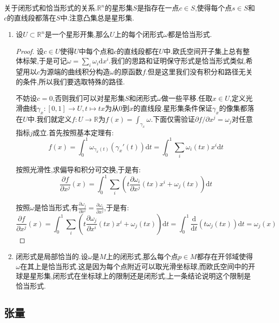 关于闭形式和恰当形式的关系.$\mathbb{R}^n$的星形集$S$是指存在一点$c\in S$,使得每个点$s\in S$和$c$的直线段都落在$S$中.注意凸集总是星形集.
\begin{enumerate}
	\item 设$U\subset\mathbb{R}^n$是一个星形开集,那么$U$上的每个闭形式$\omega$都是恰当形式.
	\begin{proof}
		
		设$c\in U$使得$U$中每个点和$c$的直线段都在$U$中.欧氏空间开子集上总有整体标架,于是可记$\omega=\sum_i\omega_i\mathrm{d}x^i$.我们的思路和证明保守形式是恰当形式类似,希望用以$c$为源端的曲线积分构造$\omega$的原函数$f$.但是这里我们没有积分和路径无关的条件,所以我们要选取特殊的路径.
		
		不妨设$c=0$,否则我们可以对星形集$S$和闭形式$\omega$做一些平移.任取$x\in U$,定义光滑曲线$\gamma_x:[0,1]\to U,t\mapsto tx$为从$0$到$x$的直线段.星形集条件保证$\gamma_x$的像集都落在$U$中.我们就定义$f:U\to\mathbb{R}$为$f(x)=\int_{\gamma_x}\omega$.下面仅需验证$\partial f/\partial x^j=\omega_j$对任意指标$j$成立.首先按照基本定理有:
		$$f(x)=\int_0^1\omega_{\gamma_x(t)}(\gamma_x'(t))\mathrm{d}t=\int_0^1\sum_i\omega_i(tx)x^i\mathrm{d}t$$
		
		按照光滑性,求偏导和积分可交换,于是有:
		$$\frac{\partial f}{\partial x^j}(x)=\int_0^1\sum_i\left(t\frac{\partial\omega_i}{\partial x^j}(tx)x^i+\omega_j(tx)\right)\mathrm{d}t$$
		
		按照$\omega$是恰当形式,有$\frac{\partial\omega_j}{\partial x^i}=\frac{\partial\omega_i}{\partial x^j}$,于是有:
		$$\frac{\partial f}{\partial x^j}(x)=\int_0^1\sum_i\left(t\frac{\partial\omega_j}{\partial x^i}(tx)x^i+\omega_j(tx)\right)\mathrm{d}t=\int_0^1\frac{\mathrm{d}}{\mathrm{d}t}(t\omega_j(tx))\mathrm{d}t=\omega_j(x)$$
	\end{proof}
    \item 闭形式是局部恰当的.设$\omega$是$M$上的闭形式,那么每个点$p\in M$都存在开邻域使得$\omega$在其上是恰当形式.这是因为每个点附近可以取光滑坐标球,而欧氏空间中的开球是星形集,闭形式在坐标球上的限制还是闭形式,上一条结论说明这个限制是恰当形式.
\end{enumerate}

\subsection{张量}

